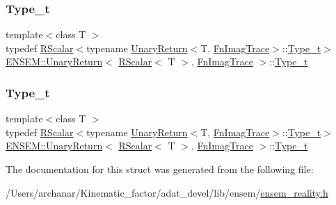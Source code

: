 \subsubsection{\texorpdfstring{Type\_t}{Type\_t}\hspace{0.1cm}{\footnotesize\ttfamily [1/2]}}
{\footnotesize\ttfamily template$<$class T $>$ \\
typedef \mbox{\hyperlink{classENSEM_1_1RScalar}{R\+Scalar}}$<$typename \mbox{\hyperlink{structENSEM_1_1UnaryReturn}{Unary\+Return}}$<$T, \mbox{\hyperlink{structENSEM_1_1FnImagTrace}{Fn\+Imag\+Trace}}$>$\+::\mbox{\hyperlink{structENSEM_1_1UnaryReturn_3_01RScalar_3_01T_01_4_00_01FnImagTrace_01_4_ade2d3556f547d545e7db88cb51393a3d}{Type\+\_\+t}}$>$ \mbox{\hyperlink{structENSEM_1_1UnaryReturn}{E\+N\+S\+E\+M\+::\+Unary\+Return}}$<$ \mbox{\hyperlink{classENSEM_1_1RScalar}{R\+Scalar}}$<$ T $>$, \mbox{\hyperlink{structENSEM_1_1FnImagTrace}{Fn\+Imag\+Trace}} $>$\+::\mbox{\hyperlink{structENSEM_1_1UnaryReturn_3_01RScalar_3_01T_01_4_00_01FnImagTrace_01_4_ade2d3556f547d545e7db88cb51393a3d}{Type\+\_\+t}}}

\mbox{\label{structENSEM_1_1UnaryReturn_3_01RScalar_3_01T_01_4_00_01FnImagTrace_01_4_ade2d3556f547d545e7db88cb51393a3d}} 
\subsubsection{\texorpdfstring{Type\_t}{Type\_t}\hspace{0.1cm}{\footnotesize\ttfamily [2/2]}}
{\footnotesize\ttfamily template$<$class T $>$ \\
typedef \mbox{\hyperlink{classENSEM_1_1RScalar}{R\+Scalar}}$<$typename \mbox{\hyperlink{structENSEM_1_1UnaryReturn}{Unary\+Return}}$<$T, \mbox{\hyperlink{structENSEM_1_1FnImagTrace}{Fn\+Imag\+Trace}}$>$\+::\mbox{\hyperlink{structENSEM_1_1UnaryReturn_3_01RScalar_3_01T_01_4_00_01FnImagTrace_01_4_ade2d3556f547d545e7db88cb51393a3d}{Type\+\_\+t}}$>$ \mbox{\hyperlink{structENSEM_1_1UnaryReturn}{E\+N\+S\+E\+M\+::\+Unary\+Return}}$<$ \mbox{\hyperlink{classENSEM_1_1RScalar}{R\+Scalar}}$<$ T $>$, \mbox{\hyperlink{structENSEM_1_1FnImagTrace}{Fn\+Imag\+Trace}} $>$\+::\mbox{\hyperlink{structENSEM_1_1UnaryReturn_3_01RScalar_3_01T_01_4_00_01FnImagTrace_01_4_ade2d3556f547d545e7db88cb51393a3d}{Type\+\_\+t}}}



The documentation for this struct was generated from the following file\+:\begin{DoxyCompactItemize}
\item 
/\+Users/archanar/\+Kinematic\+\_\+factor/adat\+\_\+devel/lib/ensem/\mbox{\hyperlink{lib_2ensem_2ensem__reality_8h}{ensem\+\_\+reality.\+h}}\end{DoxyCompactItemize}
